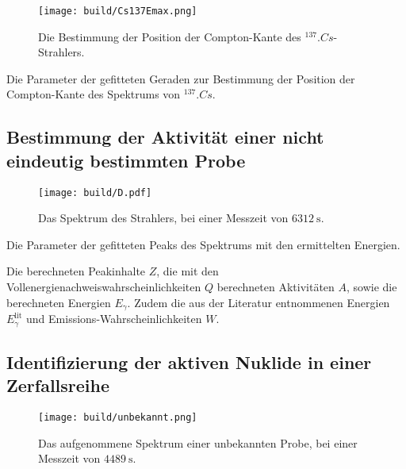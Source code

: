 \begin{figure}
	\centering
	\texttt{[image: build/Cs137Emax.png]}
	\caption{Die Bestimmung der Position der Compton-Kante des $^{137}.{Cs}$-Strahlers.}
	\label{fig:Emax}
\end{figure}

\begin{table}
	\centering
	\caption{Die Parameter der gefitteten Geraden zur Bestimmung der Position der Compton-Kante des Spektrums von $^{137}.{Cs}$.}
	
\end{table}

\subsection{Bestimmung der Aktivität einer nicht eindeutig bestimmten Probe}

\begin{figure}
	\centering
	\texttt{[image: build/D.pdf]}
	\caption{Das Spektrum des Strahlers, bei einer Messzeit von $\SI{6312}{\second}$.}
	\label{fig:Ba}
\end{figure}

\begin{table}
	\centering
	\caption{Die Parameter der gefitteten Peaks des Spektrums mit den ermittelten Energien.}
	
	\label{tab:parameterBa}
\end{table}

\begin{table}
	\centering
	\caption{Die berechneten Peakinhalte $Z$, die mit den Vollenergienachweiswahrscheinlichkeiten $Q$ berechneten Aktivitäten $A$,  sowie die berechneten Energien $E_\gamma$.  Zudem die aus der Literatur entnommenen Energien $E_\gamma^\text{lit}$ und Emissions-Wahrscheinlichkeiten $W$.}
	
	\label{tab:ABa}
\end{table}

\subsection{Identifizierung der aktiven Nuklide in einer Zerfallsreihe}

\begin{figure}
	\centering
	\texttt{[image: build/unbekannt.png]}
	\caption{Das aufgenommene Spektrum einer unbekannten Probe, bei einer Messzeit von $\SI{4489}{\second}$.}
	\label{fig:SpektrumUnbekannt}
\end{figure}

